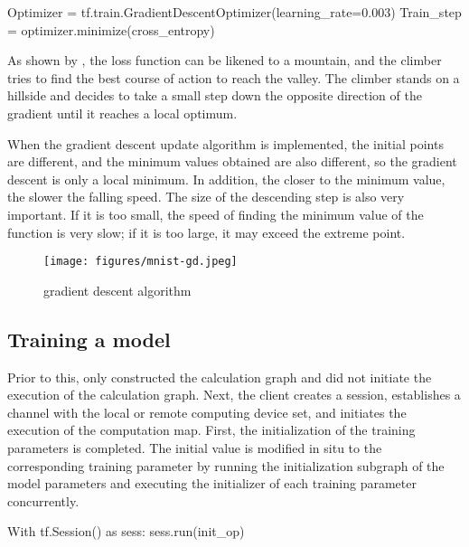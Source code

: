 \begin{content}
\begin{content}
\begin{leftbar}
\begin{python}
Optimizer = tf.train.GradientDescentOptimizer(learning_rate=0.003)
Train_step = optimizer.minimize(cross_entropy)
\end{python}
\end{leftbar}

As shown by , the loss function can be likened to a mountain, and the climber tries to find the best course of action to reach the valley. The climber stands on a hillside and decides to take a small step down the opposite direction of the gradient until it reaches a local optimum.

When the gradient descent update algorithm is implemented, the initial points are different, and the minimum values ​​obtained are also different, so the gradient descent is only a local minimum. In addition, the closer to the minimum value, the slower the falling speed. The size of the descending step is also very important. If it is too small, the speed of finding the minimum value of the function is very slow; if it is too large, it may exceed the extreme point.

\begin{figure}[H]
  \centering
  \texttt{[image: figures/mnist-gd.jpeg]}
  \caption{gradient descent algorithm}
  \label{fig:mnist-gd}
\end{figure}


\subsection{Training a model}
Prior to this, \tf{} only constructed the calculation graph and did not initiate the execution of the calculation graph. Next, the client creates a session, establishes a channel with the local or remote computing device set, and initiates the execution of the computation map.
First, the initialization of the training parameters is completed. The initial value is modified in situ to the corresponding training parameter by running the initialization subgraph of the model parameters and executing the initializer of each training parameter concurrently.

\begin{leftbar}
\begin{python}
With tf.Session() as sess:
  sess.run(init_op)
\end{python}
\end{leftbar}


\end{content}
\end{content}
